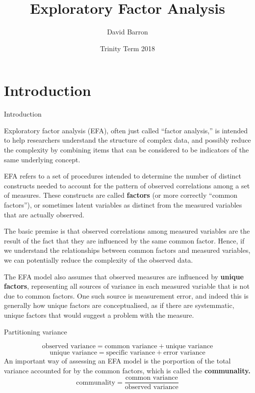 \documentclass[10pt,ignorenonframetext,]{beamer}
\title{Exploratory Factor Analysis}
\author{David Barron}
\date{Trinity Term 2018}
\begin{document}
\frame{\titlepage}

\section{Introduction}\label{introduction}

\begin{frame}{Introduction}

Exploratory factor analysis (EFA), often just called ``factor
analysis,'' is intended to help researchers understand the structure of
complex data, and possibly reduce the complexity by combining items that
can be considered to be indicators of the same underlying concept.

EFA refers to a set of procedures intended to determine the number of
distinct constructs needed to account for the pattern of observed
correlations among a set of measures. These constructs are called
\textbf{factors} (or more correctly ``common factors''), or sometimes
latent variables as distinct from the measured variables that are
actually observed.

The basic premise is that observed correlations among measured variables
are the result of the fact that they are influenced by the same common
factor. Hence, if we understand the relationships between common factors
and measured variables, we can potentially reduce the complexity of the
observed data.

The EFA model also assumes that observed measures are influenced by
\textbf{unique factors}, representing all sources of variance in each
measured variable that is not due to common factors. One such source is
measurement error, and indeed this is generally how unique factors are
conceptualised, as if there are systemmatic, unique factors that would
suggest a problem with the measure.

\end{frame}

\begin{frame}{Partitioning variance}

\[
\text{observed variance} = \text{common variance} + \text{unique variance}
\] \[
\text{unique variance} = \text{specific variance} + \text{error variance}
\] An important way of assessing an EFA model is the porportion of the
total variance accounted for by the common factors, which is called the
\textbf{communality.} \[
\text{communality} = \frac{\text{common variance}}{\text{observed variance}}
\]

\end{frame}
\end{document}
